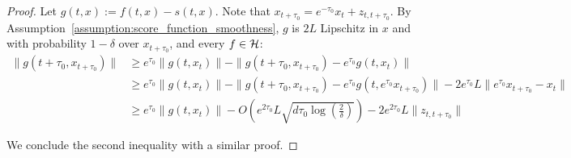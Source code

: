 \begin{proof}
Let $g(t,x) := f(t,x)-s(t,x)$. Note that $x_{t+\tau_0} = e^{-\tau_0}x_t + z_{t,t+\tau_0}$. By Assumption~\ref{assumption:score_function_smoothness}, $g$ is $2L$ Lipschitz in $x$ and with probability $1-\delta$ over $x_{t+\tau_0}$, and every $f \in \mathcal{H}$:
    \begin{align}
        \|g(t+\tau_0,x_{t+\tau_0})\| &\geq e^{\tau_0}\|g(t,x_t)\| - \|g(t+\tau_0,x_{t+\tau_0}) - e^{\tau_0}g(t,x_t)\| \nonumber \\
        &\geq e^{\tau_0}\|g(t,x_t)\| - \|g(t+\tau_0,x_{t+\tau_0}) - e^{\tau_0}g(t,e^{\tau_0}x_{t+\tau_0})\| - 2e^{\tau_0}L\|e^{\tau_0}x_{t+\tau_0}-x_t\| \nonumber \\
        &\geq e^{\tau_0}\|g(t,x_t)\|- O(e^{2\tau_0}L\sqrt{d\tau_0\log(\tfrac{2}{\delta})}) - 2e^{2\tau_0}L\|z_{t,t+\tau_0}\|
    \end{align}

We conclude the second inequality with a similar proof. 
\end{proof}

